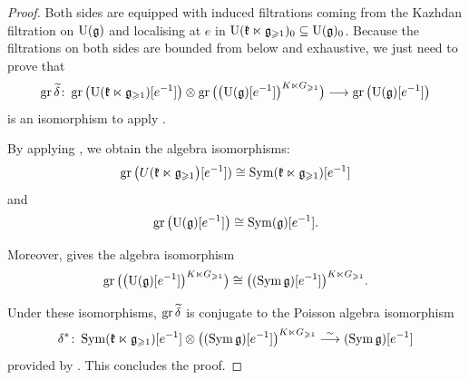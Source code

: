 \begin{proof}
	Both sides are equipped with induced filtrations coming from the Kazhdan filtration on $\mathrm U(\mathfrak g)$ and localising at $e$ in $\mathrm U(\mathfrak k \ltimes \mathfrak g_{\geqslant 1})_0 \subseteq \mathrm U(\mathfrak g)_0$. Because the filtrations on both sides are bounded from below and exhaustive, we just need to prove that
	\[ \operatorname{gr} \widetilde\delta \colon \operatorname{gr} \big(\mathrm U(\mathfrak k \ltimes \mathfrak g_{\geqslant 1})[e^{-1}]\big) \otimes \operatorname{gr} \big(\big(\mathrm U(\mathfrak g)[e^{-1}]\big)^{K \ltimes G_{\geqslant 1}}\big) \longrightarrow \operatorname{gr}\big( \mathrm U(\mathfrak g)[e^{-1}]\big) \]
	is an isomorphism to apply .
	
	By applying , we obtain the algebra isomorphisms:
	\[ \operatorname{gr}\big(U(\mathfrak k \ltimes \mathfrak g_{\geqslant 1}\big)[e^{-1}]) \cong \operatorname{Sym}(\mathfrak k \ltimes \mathfrak g_{\geqslant 1})[e^{-1}]  \]
	and 
	\[ \operatorname{gr}\big(\mathrm U(\mathfrak g)[e^{-1}]\big) \cong \operatorname{Sym}(\mathfrak g)[e^{-1}]. \]
	
	Moreover,  gives the algebra isomorphism
	\[ \operatorname{gr} \big(\big(\mathrm U(\mathfrak g)[e^{-1}]\big)^{K \ltimes G_{\geqslant 1}}\big) \cong \big((\operatorname{Sym}\mathfrak g)[e^{-1}]\big)^{K \ltimes G_{\geqslant 1}}.  \]
	
	Under these isomorphisms, $\operatorname{gr} \widetilde{\delta}$ is conjugate to the Poisson algebra isomorphism 
	\[ \delta^* \colon \operatorname{Sym}(\mathfrak k \ltimes \mathfrak g_{\geqslant 1})[e^{-1}] \otimes \big((\operatorname{Sym} \mathfrak g)[e^{-1}]\big)^{K \ltimes G_{\geqslant 1}}  \overset{\sim}{\longrightarrow} (\operatorname{Sym} \mathfrak g)[e^{-1}]  \]
	provided by . This concludes the proof.
\end{proof}
